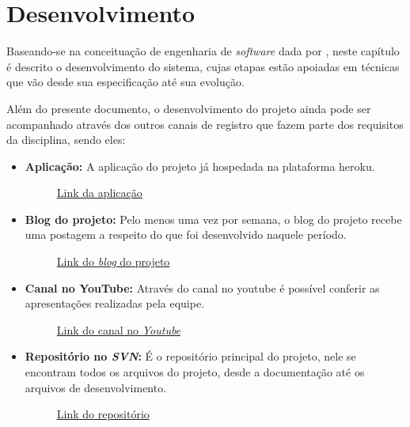\chapter{Desenvolvimento}
Baseando-se na conceituação de engenharia de \textsl{software} dada por , neste capítulo é descrito o desenvolvimento do sistema, cujas etapas estão apoiadas em técnicas que vão desde sua especificação até sua evolução.

Além do presente documento, o desenvolvimento do projeto ainda pode ser acompanhado através dos outros canais de registro que fazem parte dos requisitos da disciplina, sendo eles:

\begin{itemize}
    \item \textbf{Aplicação:} A aplicação do projeto já hospedada na plataforma \gls{heroku}.
    \begin{figure}[htb]
    \centering
    \caption{\href{https://app-ifriends.herokuapp.com}{Link da aplicação}}
    \end{figure}
    \FloatBarrier
    \item \textbf{Blog do projeto:} Pelo menos uma vez por semana, o blog do projeto recebe uma postagem a respeito do que foi desenvolvido naquele período. 
    
    \begin{figure}[htb]
    \centering
    \caption{\href{https://bunkabytes.blogspot.com}{Link do \textit{blog} do projeto}}
    \end{figure}
    \FloatBarrier
    \item \textbf{Canal no YouTube:} Através do canal no \gls{youtube} é possível conferir as apresentações realizadas pela equipe.
    
    \begin{figure}[htb]
    \centering
    \caption{\href{https://www.youtube.com/channel/UCOJVZlclPTqngZQwPS9Fvpg}{Link do canal no \textit{Youtube}}}
    \end{figure}
    \FloatBarrier
    \item \textbf{Repositório no \textit{SVN}:} É o repositório principal do projeto, nele se encontram todos os arquivos do projeto, desde a documentação até os arquivos de desenvolvimento. 
    
    \begin{figure}[htb]
    \centering
    \caption{\href{https://svn.spo.ifsp.edu.br/svn/a6pgp/A2022-PDS-SEG/Bunka_Bytes/}{Link do repositório}}
    \end{figure}
    \FloatBarrier
\end{itemize}

